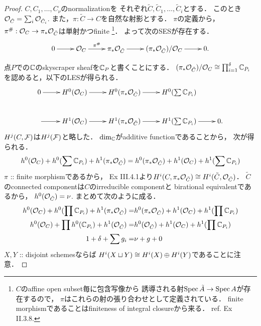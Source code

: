 \documentclass[a4paper]{jsarticle}
\begin{document}
    \begin{proof}
        $C, C_1,\dots, C_{\nu}$のnormalizationを
        それぞれ$\tilde{C}, \tilde{C}_1,\dots,\tilde{C}_i$とする．
        このとき$\mathcal{O}_{\tilde{C}}=\sum_i \mathcal{O}_{\tilde{C}_i}$.
        また，$\pi: \tilde{C} \to C$を自然な射影とする．
        $\pi$の定義から，
        $\pi^{\#}: \mathcal{O}_{C} \to \pi_* \mathcal{O}_{\tilde{C}}$は単射かつfinite
        \footnote
        {
            $C$のaffine open subset毎に包含写像から
            誘導される射$\operatorname{Spec} \tilde{A} \to \operatorname{Spec} A$が存在するので，
            $\pi$はこれらの射の張り合わせとして定義されている．
            finite morphismであることはfiniteness of integral closureから来る．
            ref. \cite{HarAG} Ex II.3.8.
        }．
        よって次のSESが存在する．
        \[\xymatrix{
                0 \ar[r]& \shO_{C} \ar[r]^-{\pi^{\#}}& \pi_* \shO_{\tilde{C}} \ar[r]&
                (\pi_* \shO_{\tilde{C}})/\shO_{C} \ar[r]& 0.
        }\]

        点$P$での$\mathbb{C}$のskyscraper sheafを$\mathbb{C}_P$と書くことにする．
        $(\pi_* \mathcal{O}_{\tilde{C}})/\mathcal{O}_{C} \cong \prod_{i=1}^{\delta} \mathbb{C}_{P_i}$
        を認めると，以下のLESが得られる．
        \[\xymatrix{
            0 \ar[r] & H^0(\shO_{C}) \ar[r]& H^0(\pi_* \shO_{\tilde{C}}) \ar[r]& H^0(\sum \C_{P_i}) \\
            {}\ar[r] & H^1(\shO_{C}) \ar[r]& H^1(\pi_* \shO_{\tilde{C}}) \ar[r]& H^1(\sum \C_{P_i}) \ar[r]& 0.
        }\]
        $H^j(C, \mathcal{F})$は$H^j(\mathcal{F})$と略した．
        $\dim_{\mathbb{C}}$がadditive functionであることから，
        次が得られる．
        \[
            h^0(\mathcal{O}_{C})+h^0(\sum \mathbb{C}_{P_i})+h^1(\pi_* \mathcal{O}_{\tilde{C}})
            =h^0(\pi_* \mathcal{O}_{\tilde{C}})+h^1(\mathcal{O}_{C})+h^1(\sum \mathbb{C}_{P_i})
        \]
        $\pi$ :: finite morphismであるから，
        \cite{HarAG} Ex III.4.1より$H^i(C, \pi_*\mathcal{O}_{\tilde{C}}) \cong H^i(\tilde{C}, \mathcal{O}_{\tilde{C}})$．
        $\tilde{C}$のconnected componentは$C$のirreducible componentと
        birational equivalentであるから，
        $h^0(\mathcal{O}_{\tilde{C}})=\nu$.
        まとめて次のように成る．
        \begin{align*}
            h^0(\mathcal{O}_{C})+h^0(\prod \mathbb{C}_{P_i})+h^1(\pi_* \mathcal{O}_{\tilde{C}})
            =&h^0(\pi_* \mathcal{O}_{\tilde{C}})+h^1(\mathcal{O}_{C})+h^1(\prod \mathbb{C}_{P_i}) \\
            h^0(\mathcal{O}_{C})+\prod h^0(\mathbb{C}_{P_i})+h^1(\mathcal{O}_{\tilde{C}})
            =&h^0(\mathcal{O}_{\tilde{C}})+h^1(\mathcal{O}_{C})+h^1(\prod \mathbb{C}_{P_i}) \\
            1+\delta+\sum g_i
            =&\nu+g+0
        \end{align*}
        $X, Y$ :: disjoint schemesならば
        $H^i(X \sqcup Y) \cong H^i(X) \oplus H^i(Y)$であることに注意．


\end{proof}
\end{document}
